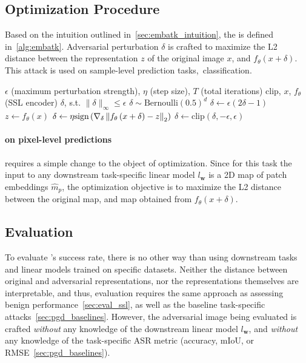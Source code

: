 \subsection{Optimization Procedure}

Based on the intuition outlined in~\cref{sec:embatk_intuition}, the \EmbedAttack is defined in~\cref{alg:embatk}. Adversarial perturbation $\delta$ is crafted to maximize the L2 distance between the representation $z$ of the original image $x$, and $f_\theta(x+\delta)$. This attack is used on sample-level prediction tasks,~\eg classification. 

\begin{algorithm}
\caption{\EmbedAttack algorithm.}
\label{alg:embatk}
\begin{algorithmic}
    \Require $\epsilon$ (maximum perturbation strength), $\eta$ (step size), $T$ (total iterations)
    \Require clip, $x$, $f_\theta$ (SSL encoder)
    \Ensure $\delta$, s.t. $\|\delta\|_\infty\leq\epsilon$
    \State $\delta\sim\text{Bernoulli}(0.5)^d$ 
    \State $\delta\gets\epsilon(2\delta-1)$ 
    \State $z\gets f_\theta(x)$ 
        \State $\delta\gets\eta{\text{sign}}\left(\nabla_\delta\left\|f_\theta\left(x+\delta\right)-z\right\|_2\right)$ 
        \State $\delta\gets\text{clip}(\delta,-\epsilon,\epsilon)$ 
    \EndFor
\end{algorithmic}
\end{algorithm}

\paragraph{\EmbedAttack on pixel-level predictions} requires a simple change to the object of optimization. Since for this task the input to any downstream task-specific linear model $l_\mathbf{w}$ is a 2D map of patch embeddings $\hat{m}_p$, the optimization objective is to maximize the L2 distance between the original map, and map obtained from $f_\theta(x+\delta)$.

\subsection{Evaluation}

To evaluate \EmbedAttack's success rate, there is no other way than using downstream tasks and linear models trained on specific datasets. Neither the distance between original and adversarial representations, nor the representations themselves are interpretable, and thus, evaluation requires the same approach as assessing benign performance~\cref{sec:eval_ssl}, as well as the baseline task-specific attacks~\cref{sec:pgd_baselines}. However, the adversarial image being evaluated is crafted \textit{without} any knowledge of the downstream linear model $l_\mathbf{w}$, and \textit{without} any knowledge of the task-specific ASR metric (accuracy, mIoU, or RMSE~\cref{sec:pgd_baselines}).

